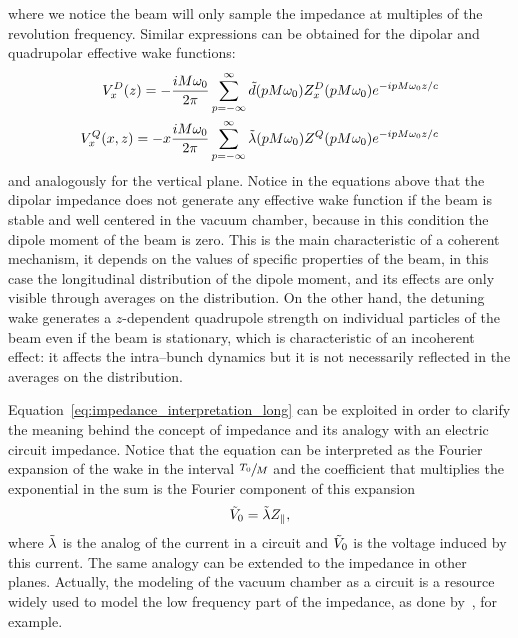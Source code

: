     where we notice the beam will only sample the impedance at multiples of the revolution frequency. Similar expressions can be obtained for the dipolar and quadrupolar effective wake functions:
    \begin{subequations}\label{eq:impedance_interpretation_trans}
    \begin{align}\label{eq:impedance_interpretation_dip}
  		V^D_x(z) = -\frac{iM\omega_0}{2\pi} \sum_{p=-\infty}^\infty \tilde{d}(pM\omega_0)Z^D_x(pM\omega_0)e^{-ipM\omega_0 z/c}\\
        \label{eq:impedance_interpretation_quad}
		V^Q_x(x,z) = -x\frac{iM\omega_0}{2\pi} \sum_{p=-\infty}^\infty \tilde{\lambda}(pM\omega_0)Z^Q(pM\omega_0)e^{-ipM\omega_0 z/c}
    \end{align}
    \end{subequations}
    and analogously for the vertical plane. Notice in the equations above that the dipolar impedance does not generate any effective wake function if the beam is stable and well centered in the vacuum chamber, because in this condition the dipole moment of the beam is zero. This is the main characteristic of a coherent mechanism, it depends on the values of specific properties of the beam, in this case the longitudinal distribution of the dipole moment, and its effects are only visible through averages on the distribution. On the other hand, the detuning wake generates a $z$-dependent quadrupole strength on individual particles of the beam even if the beam is stationary, which is characteristic of an incoherent effect: it affects the intra--bunch dynamics but it is not necessarily reflected in the averages on the distribution.

    Equation~\eqref{eq:impedance_interpretation_long} can be exploited in order to clarify the meaning behind the concept of impedance and its analogy with an electric circuit impedance. Notice that the equation can be interpreted as the Fourier expansion of the wake in the interval $\sfrac{T_0}{M}$ and the coefficient that multiplies the exponential in the sum is the Fourier component of this expansion
    \begin{align}
  	  	\tilde{V}_0 = \tilde{\lambda}Z_\parallel,
    \end{align}
    where $\tilde{\lambda}$ is the analog of the current in a circuit and $\tilde{V}_0$ is the voltage induced by this current. The same analogy can be extended to the impedance in other planes. Actually, the modeling of the vacuum chamber as a circuit is a resource widely used to model the low frequency part of the impedance, as done by~, for example.


